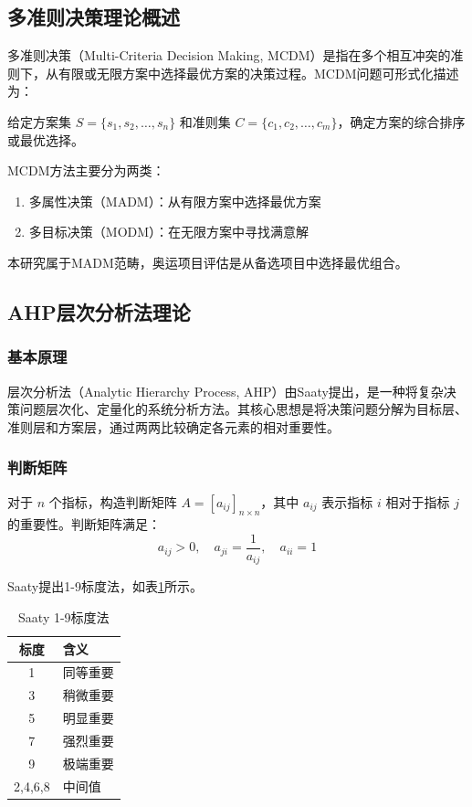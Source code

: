 
\subsection{多准则决策理论概述}

多准则决策（Multi-Criteria Decision Making, MCDM）是指在多个相互冲突的准则下，从有限或无限方案中选择最优方案的决策过程。MCDM问题可形式化描述为：

给定方案集 $S = \{s_1, s_2, \ldots, s_n\}$ 和准则集 $C = \{c_1, c_2, \ldots, c_m\}$，确定方案的综合排序或最优选择。

MCDM方法主要分为两类：
\begin{enumerate}
\item 多属性决策（MADM）：从有限方案中选择最优方案
\item 多目标决策（MODM）：在无限方案中寻找满意解
\end{enumerate}

本研究属于MADM范畴，奥运项目评估是从备选项目中选择最优组合。

\subsection{AHP层次分析法理论}

\subsubsection{基本原理}

层次分析法（Analytic Hierarchy Process, AHP）由Saaty\cite{saaty2007analytic}提出，是一种将复杂决策问题层次化、定量化的系统分析方法。其核心思想是将决策问题分解为目标层、准则层和方案层，通过两两比较确定各元素的相对重要性。

\subsubsection{判断矩阵}

对于 $n$ 个指标，构造判断矩阵 $A = [a_{ij}]_{n \times n}$，其中 $a_{ij}$ 表示指标 $i$ 相对于指标 $j$ 的重要性。判断矩阵满足：
\begin{equation}
a_{ij} > 0, \quad a_{ji} = \frac{1}{a_{ij}}, \quad a_{ii} = 1
\label{eq:reciprocal}
\end{equation}

Saaty提出1-9标度法，如表\ref{tab:scale}所示。

\begin{table}[htbp]
\centering
\caption{Saaty 1-9标度法}
\label{tab:scale}
\begin{tabular}{cl}
\toprule
标度 & 含义 \\
\midrule
1 & 同等重要 \\
3 & 稍微重要 \\
5 & 明显重要 \\
7 & 强烈重要 \\
9 & 极端重要 \\
2,4,6,8 & 中间值 \\
\bottomrule
\end{tabular}
\end{table}

